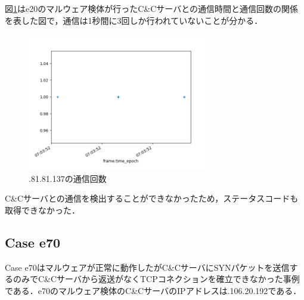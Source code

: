 \documentclass[twocolumn]{ltjsarticle}
\begin{document}
図\ref{fig:e20_count}はe20のマルウェア検体が行ったC\&Cサーバとの通信時間と通信回数の関係を表した図で，通信は1秒間に3回しか行われていないことが分かる．
\begin{figure}[htbp]
  \centering
  \includegraphics[width=8cm]{images/20201214_修士論文予稿/e20_count.png}
  \caption{\ast\ast\ast.81.81.137の通信回数}
  \label{fig:e20_count}
\end{figure}

C\&Cサーバとの通信を検出することができなかったため，ステータスコードも取得できなかった．

\subsection{Case e70}
Case e70はマルウェアが正常に動作したがC\&CサーバにSYNパケットを送信するのみでC\&Cサーバから返送がなくTCPコネクションを確立できなかった事例である．e70のマルウェア検体のC\&CサーバのIPアドレスは\ast\ast\ast.106.20.192である．
\end{document}
